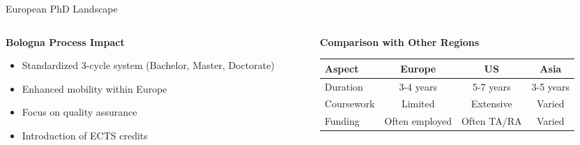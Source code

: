 \documentclass[aspectratio=169,10pt]{beamer}
\begin{document}
\begin{frame}{European PhD Landscape}
\begin{columns}[T]
    \begin{column}{0.5\textwidth}
        \textbf{Bologna Process Impact}
        \begin{itemize}
            \item Standardized 3-cycle system (Bachelor, Master, Doctorate)
            \item Enhanced mobility within Europe
            \item Focus on quality assurance
            \item Introduction of ECTS credits
        \end{itemize}
    \end{column}
    \begin{column}{0.5\textwidth}
        \textbf{Comparison with Other Regions}
        \begin{tabular}{|l|c|c|c|}
        \hline
        Aspect & Europe & US & Asia \\
        \hline
        Duration & 3-4 years & 5-7 years & 3-5 years \\
        Coursework & Limited & Extensive & Varied \\
        Funding & Often employed & Often TA/RA & Varied \\
        \hline
        \end{tabular}
    \end{column}
\end{columns}
\end{frame}
\end{document}
